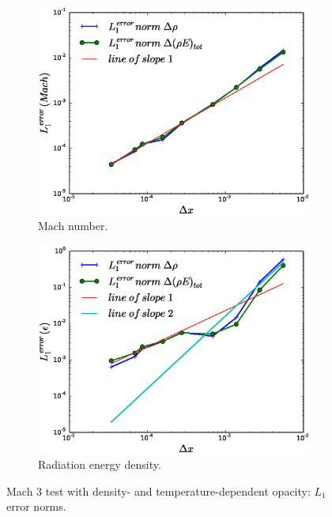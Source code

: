 \documentclass[times,doublespace]{fldauth}%
\begin{document}
\begin{figure}[ht]
%
    \begin{subfigure}{0.49\textwidth}
    \includegraphics[width=\linewidth]{figures/dpt-xs/mass-energy-diff-scd-method-mach-number-convergence.eps}
    \caption{Mach number.}\label{fig:mach-3-dpt-xs-mach-conv}
    \end{subfigure}
%
    \begin{subfigure}{0.49\textwidth}
    \includegraphics[width=\linewidth]{figures/dpt-xs/mass-energy-diff-scd-method-radiation-convergence.eps}
    \caption{Radiation energy density.}\label{fig:mach-3-dpt-xs-radiation-conv}
    \end{subfigure}        
\caption{Mach $3$ test with density- and temperature-dependent opacity: $L_1$ error norms.}\label{fig:mach-3-dpt-xs-conv} 
\end{figure}
\end{document}
